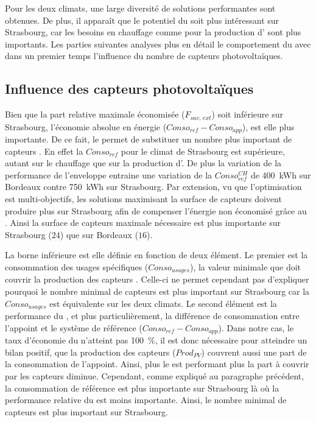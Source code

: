 Pour les deux climats, une large diversité de solutions performantes sont obtenues.
De plus, il apparaît que le potentiel du  soit plus intéressant sur Strasbourg,
car les besoins en chauffage comme pour la production d’ sont plus importants.
Les parties suivantes analyses plus en détail le comportement du  avec dans un
premier temps l’influence du nombre de capteurs photovoltaïques.



\subsection{Influence des capteurs photovoltaïques} %
\label{sub:influence_des_capteurs_photovoltaiques}
Bien que la part relative maximale économisée ($F_{sav,\,ext}$) soit inférieure sur
Strasbourg, l’économie absolue en énergie ($Conso_{ref} - Conso_{app}$), est elle plus
importante. De ce fait, le  permet de substituer un nombre plus important de
capteurs . En effet la $Conso_{ref}$ pour le climat de Strasbourg est supérieure,
autant sur le chauffage que sur la production d’. De plus la variation de la
performance de l’enveloppe entraine une variation de la $Conso_{ref}^{CH}$ de
\SI{400}{kWh} sur Bordeaux contre \SI{750}{kWh} sur Strasbourg. Par extension, vu que
l’optimisation est multi-objectifs, les solutions maximisant la surface de capteurs
 doivent produire plus sur Strasbourg afin de compenser l’énergie non économisé
grâce au . Ainsi la surface de capteurs  maximale nécessaire est plus
importante sur Strasbourg ($24$) que sur Bordeaux ($16$).

La borne inférieure est elle définie en fonction de deux élément. Le premier est la
consommation des usages spécifiques ($Conso_{usages}$), la valeur minimale que doit
couvrir la production des capteurs . Celle-ci ne permet cependant pas d’expliquer
pourquoi le nombre minimal de capteurs  est plus important sur Strasbourg car la
$Conso_{usages}$ est équivalente sur les deux climats. Le second élément est la
performance du , et plus particulièrement, la différence de consommation entre
l’appoint et le système de référence ($Conso_{ref} - Conso_{app}$). Dans notre cas, le
taux d’économie du  n’atteint pas \SI{100}{\percent}, il est donc nécessaire pour
atteindre un bilan positif, que la production des capteurs  ($Prod_{PV}$) couvrent
aussi une part de la consommation de l’appoint. Ainsi, plus le  est performant
plus la part à couvrir par les capteurs  diminue. Cependant, comme expliqué au
paragraphe précédent, la consommation de référence est plus importante sur Strasbourg là
où la performance relative du  est moins importante. Ainsi, le nombre minimal de
capteurs  est plus important sur Strasbourg.


